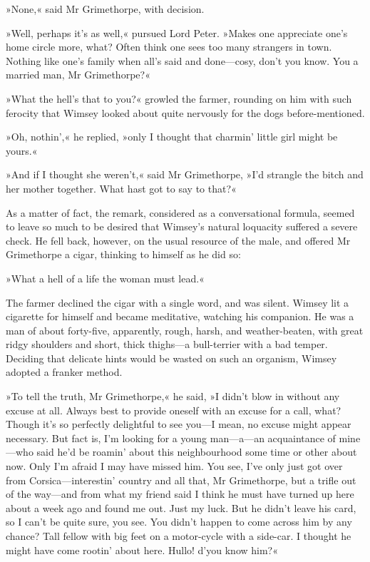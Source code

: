 »None,« said Mr Grimethorpe, with decision.

»Well, perhaps it's as well,« pursued Lord Peter. »Makes one appreciate one's home circle more, what? Often think one sees too many strangers in town. Nothing like one's family when all's said and done\allowbreak---\allowbreak cosy, don't you know. You a married man, Mr Grimethorpe?«

»What the hell's that to you?« growled the farmer, rounding on him with such ferocity that Wimsey looked about quite nervously for the dogs before-mentioned.

»Oh, nothin',« he replied, »only I thought that charmin' little girl might be yours.«

»And if I thought she weren't,« said Mr Grimethorpe, »I'd strangle the bitch and her mother together. What hast got to say to that?«

As a matter of fact, the remark, considered as a conversational formula, seemed to leave so much to be desired that Wimsey's natural loquacity suffered a severe check. He fell back, however, on the usual resource of the male, and offered Mr Grimethorpe a cigar, thinking to himself as he did so:

»What a hell of a life the woman must lead.«

The farmer declined the cigar with a single word, and was silent.  Wimsey lit a cigarette for himself and became meditative, watching his companion. He was a man of about forty-five, apparently, rough, harsh, and weather-beaten, with great ridgy shoulders and short, thick thighs\allowbreak---\allowbreak a bull-terrier with a bad temper. Deciding that delicate hints would be wasted on such an organism, Wimsey adopted a franker method.

»To tell the truth, Mr Grimethorpe,« he said, »I didn't blow in without any excuse at all. Always best to provide oneself with an excuse for a call, what? Though it's so perfectly delightful to see you\allowbreak---\allowbreak I mean, no excuse might appear necessary. But fact is, I'm looking for a young man\allowbreak---\allowbreak a---an acquaintance of mine\allowbreak---\allowbreak who said he'd be roamin' about this neighbourhood some time or other about now. Only I'm afraid I may have missed him. You see, I've only just got over from Corsica\allowbreak---\allowbreak interestin' country and all that, Mr Grimethorpe, but a trifle out of the way\allowbreak---\allowbreak and from what my friend said I think he must have turned up here about a week ago and found me out. Just my luck.  But he didn't leave his card, so I can't be quite sure, you see. You didn't happen to come across him by any chance? Tall fellow with big feet on a motor-cycle with a side-car. I thought he might have come rootin' about here. Hullo! d'you know him?«

